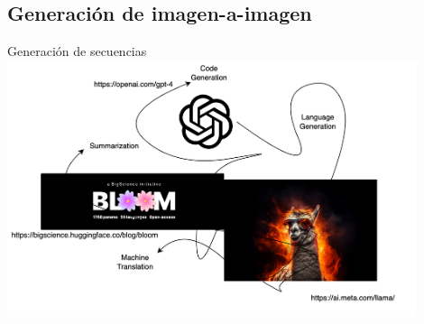 \documentclass[9pt]{beamer}
\begin{document}
\subsection{Generación de imagen-a-imagen}
\begin{frame}{Generación de secuencias}
    \centering
    \includegraphics[width=0.9\textwidth]{diapositivas/img/llm-task.png}
\end{frame}
\end{document}
